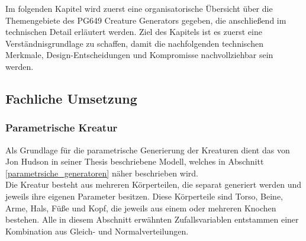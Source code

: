 \DeclarePairedDelimiter\norm{\lVert}{\rVert}

Im folgenden Kapitel wird zuerst eine organisatorische Übersicht über die Themengebiete des PG649 Creature Generators gegeben, die anschließend im technischen Detail erläutert werden. Ziel des Kapitels ist es zuerst eine Verständnisgrundlage zu schaffen, damit die nachfolgenden technischen Merkmale, Design-Entscheidungen und Kompromisse nachvollziehbar sein werden.

\subsection{Fachliche Umsetzung}

\subsubsection{Parametrische Kreatur}\label{param_method}
Als Grundlage für die parametrische Generierung der Kreaturen dient das von Jon Hudson in seiner Thesis \cite{Hudson2013CreatureGU} beschriebene Modell, welches in Abschnitt \ref{parametrsiche_generatoren} näher beschrieben wird.\\
Die Kreatur besteht aus mehreren Körperteilen, die separat generiert werden und jeweils ihre eigenen Parameter besitzen. Diese Körperteile sind Torso, Beine, Arme, Hals, Füße und Kopf, die jeweils aus einem oder mehreren Knochen bestehen. Alle in diesem Abschnitt erwähnten Zufallsvariablen entstammen einer Kombination aus Gleich- und Normalverteilungen.


